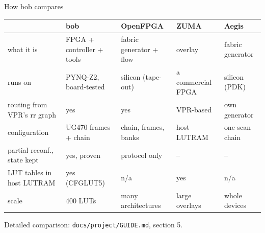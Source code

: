 \documentclass[aspectratio=169,11pt]{beamer}
\newcommand{\src}[1]{{\scriptsize\color{bobmute}#1}}
\begin{document}
\begin{frame}{How bob compares}
  \centering
  \small
  \begin{tabular}{@{}lllll@{}}
    \toprule
     & \textbf{bob} & OpenFPGA & ZUMA & Aegis \\
    \midrule
    what it is & FPGA + controller + tools & fabric generator + flow & overlay & fabric generator \\
    runs on & PYNQ-Z2, board-tested & silicon (tape-out) & a commercial FPGA & silicon (PDK) \\
    routing from VPR's rr graph & yes & yes & VPR-based & own generator \\
    configuration & UG470 frames + chain & chain, frames, banks & host LUTRAM & one scan chain \\
    partial reconf., state kept & yes, proven & protocol only & -- & -- \\
    LUT tables in host LUTRAM & yes (CFGLUT5) & n/a & yes & n/a \\
    scale & 400 LUTs & many architectures & large overlays & whole devices \\
    \bottomrule
  \end{tabular}
  \vspace{2mm}

  \src{Detailed comparison: \texttt{docs/project/GUIDE.md}, section 5.}
\end{frame}
\end{document}
